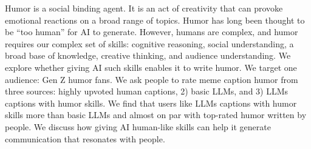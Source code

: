 Humor is a social binding agent. It is an act of creativity that can provoke emotional reactions on a broad range of topics. Humor has long been thought to be “too human” for AI to generate. However, humans are complex, and humor requires our complex set of skills: cognitive reasoning, social understanding, a broad base of knowledge, creative thinking, and audience understanding. We explore whether giving AI such skills enables it to write humor. We target one audience: Gen Z humor fans. We ask people to rate meme caption humor from three sources: highly upvoted human captions, 2) basic LLMs, and 3) LLMs captions with humor skills. We find that users like LLMs captions with humor skills more than basic LLMs and almost on par with top-rated humor written by people. We discuss how giving AI human-like skills can help it generate communication that resonates with people. 
